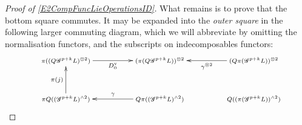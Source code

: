 \documentclass[11pt]{amsart}
\theoremstyle{plain}
\theoremstyle{definition}
\newcommand{\scrQ}{\mathscr{Q}}
\newcommand{\scrR}{\mathscr{R}}
\newcommand{\scrT}{\mathscr{T}}
\newcommand{\scrY}{\mathscr{Y}}
\newcommand{\scrI}{\mathscr{I}}
\newcommand{\scrO}{\mathscr{O}}
\newcommand{\scrP}{\mathscr{P}}
\newcommand{\scrS}{\mathscr{S}}
\newcommand{\scrG}{\mathscr{G}}
\newcommand{\scrH}{\mathscr{H}}
\newcommand{\scrJ}{\mathscr{J}}
\newcommand{\scrK}{\mathscr{K}}
\newcommand{\scrL}{\mathscr{L}}
\newcommand{\scrZ}{\mathscr{Z}}
\newcommand{\scrN}{\mathscr{N}}
\newcommand{\scrM}{\mathscr{M}}
\newcommand{\calW}{\mathcal{W}}
\theoremstyle{plain}
\newcommand{\BSW}{{\scrG}}%
\begin{document}
\begin{Composite functor spectral sequences}
\begin{proof}[Proof of \ref{E2CompFuncLieOperationsID}]
What remains is to prove that the bottom square commutes. It may be expanded into the \emph{outer square} in the following larger commuting diagram, which we will abbreviate by omitting the normalisation functors, and the subscripts on indecomposables functors:
\[
\def\objectstyle{\scriptstyle}
\xymatrix@R=8mm@C=13mm@!0{
&%
\pi((Q\BSW^{p+k}L)^{\otimes2}) \ar[rrr]_-{D_0^{\textup{v}}}
&%
&%
&%
(\pi (Q\BSW^{p+k}L))^{\otimes2}&%
&%
&%
(Q\pi(\BSW^{p+k}L))^{\otimes2} \ar[lll]^-{\gamma^{\otimes2}}\\\\%
&%
\pi Q((\BSW^{p+k}L)^{\wedge 2})\ar[uu]^-{\pi(j)}
&%
&%
&%
Q\pi((\BSW^{p+k}L)^{\wedge 2})\ar[lll]_-{\gamma}
&%
&%
&%
Q((\pi( \BSW^{p+k}L))^{\wedge 2})
}\]
\end{proof}
\end{Composite functor spectral sequences}
\end{document}
